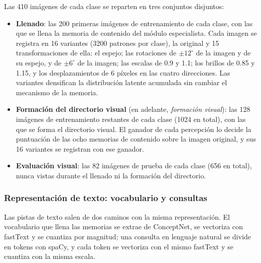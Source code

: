 Las 410 imágenes de cada clase se reparten en tres conjuntos disjuntos:
\begin{itemize}
    \item \textbf{Llenado}: las 200 primeras imágenes de entrenamiento de cada clase, con
    las que se llena la memoria de contenido del módulo especialista.
    Cada imagen se registra en 16 variantes (3200 patrones por clase), la original y 15
    transformaciones de ella: el espejo; las rotaciones de $\pm 12^{\circ}$ de la imagen y
    de su espejo, y de $\pm 6^{\circ}$ de la imagen; las escalas de 0.9 y 1.1; los brillos
    de 0.85 y 1.15, y los desplazamientos de 6 píxeles en las cuatro direcciones.
    Las variantes densifican la distribución latente acumulada sin cambiar el mecanismo
    de la memoria.
    \item \textbf{Formación del directorio visual} (en adelante, \emph{formación visual}):
    las 128 imágenes de entrenamiento restantes de cada clase (1024 en total), con las que
    se forma el directorio visual.
    El ganador de cada percepción lo decide la puntuación de las ocho memorias de
    contenido sobre la imagen original, y sus 16 variantes se registran con ese ganador.
    \item \textbf{Evaluación visual}: las 82 imágenes de prueba de cada clase (656 en
    total), nunca vistas durante el llenado ni la formación del directorio.
\end{itemize}

\subsubsection{Representación de texto: vocabulario y consultas}
\label{sec:pipeline-semantico}

Las pistas de texto salen de dos caminos con la misma representación.
El vocabulario que llena las memorias se extrae de ConceptNet, se vectoriza con
fastText y se cuantiza por magnitud; una consulta en lenguaje natural se divide en
tokens con spaCy, y cada token se vectoriza con el mismo fastText y se cuantiza con la
misma escala.

